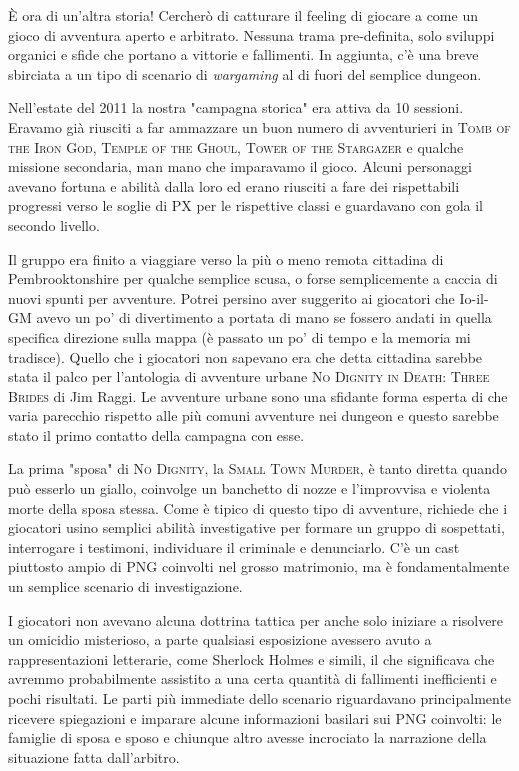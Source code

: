 
È ora di un'altra storia! Cercherò di catturare il feeling di giocare a \dnd come un gioco di avventura aperto e arbitrato. Nessuna trama pre-definita, solo sviluppi organici e sfide che portano a vittorie e fallimenti. In aggiunta, c'è una breve sbirciata a un tipo di scenario di \textit{wargaming} al di fuori del semplice dungeon.

Nell'estate del 2011 la nostra "campagna storica" era attiva da 10 sessioni. Eravamo già riusciti a far ammazzare un buon numero di avventurieri in \textsc{Tomb of the Iron God}, \textsc{Temple of the Ghoul}, \textsc{Tower of the Stargazer} e qualche missione secondaria, man mano che imparavamo il gioco. Alcuni personaggi avevano fortuna e abilità dalla loro ed erano riusciti a fare dei rispettabili progressi verso le soglie di PX per le rispettive classi e guardavano con gola il secondo livello.

Il gruppo era finito a viaggiare verso la più o meno remota cittadina di Pembrooktonshire per qualche semplice scusa, o forse semplicemente a caccia di nuovi spunti per avventure. Potrei persino aver suggerito ai giocatori che Io-il-GM avevo un po' di divertimento a portata di mano se fossero andati in quella specifica direzione sulla mappa (è passato un po' di tempo e la memoria mi tradisce). Quello che i giocatori non sapevano era che detta cittadina sarebbe stata il palco per l'antologia di avventure urbane \textsc{No Dignity in Death: Three Brides} di Jim Raggi. Le avventure urbane sono una sfidante forma esperta di \dnd che varia parecchio rispetto alle più comuni avventure nei dungeon e questo sarebbe stato il primo contatto della campagna con esse.

La prima "sposa" di \textsc{No Dignity}, la \textsc{Small Town Murder}, è tanto diretta quando può esserlo un giallo, coinvolge un banchetto di nozze e l'improvvisa e violenta morte della sposa stessa. Come è tipico di questo tipo di avventure, richiede che i giocatori usino semplici abilità investigative per formare un gruppo di sospettati, interrogare i testimoni, individuare il criminale e denunciarlo. C'è un cast piuttosto ampio di PNG coinvolti nel grosso matrimonio, ma è fondamentalmente un semplice scenario di investigazione.

I giocatori non avevano alcuna dottrina tattica per anche solo iniziare a risolvere un omicidio misterioso, a parte qualsiasi esposizione avessero avuto a rappresentazioni letterarie, come Sherlock Holmes e simili, il che significava che avremmo probabilmente assistito a una certa quantità di fallimenti inefficienti e pochi risultati. Le parti più immediate dello scenario riguardavano principalmente ricevere spiegazioni e imparare alcune informazioni basilari sui PNG coinvolti: le famiglie di sposa e sposo e chiunque altro avesse incrociato la narrazione della situazione fatta dall'arbitro.

